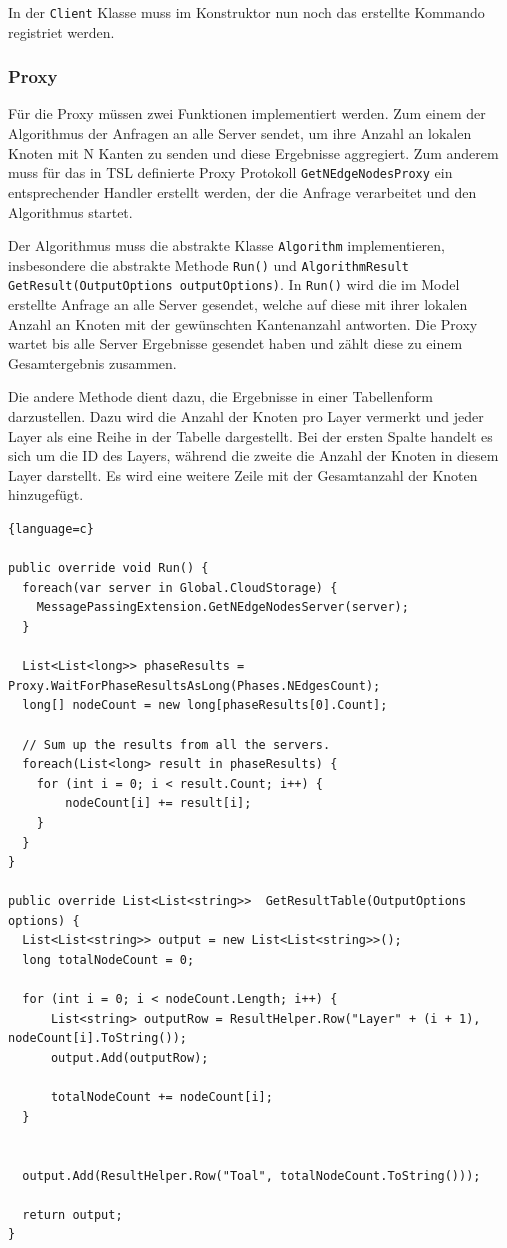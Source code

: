In der \verb|Client| Klasse muss im Konstruktor nun noch das erstellte Kommando registriet werden.

\subsubsection{Proxy}

Für die Proxy müssen zwei Funktionen implementiert werden. Zum einem der Algorithmus der Anfragen an alle Server sendet, um ihre Anzahl an lokalen Knoten mit N Kanten zu senden und diese Ergebnisse aggregiert. Zum anderem muss 
für das in TSL definierte Proxy Protokoll \verb|GetNEdgeNodesProxy| ein entsprechender Handler erstellt werden, der die Anfrage verarbeitet und den Algorithmus startet.

Der Algorithmus muss die abstrakte Klasse \verb|Algorithm| implementieren, insbesondere die abstrakte Methode \verb|Run()| und \verb|AlgorithmResult GetResult(OutputOptions outputOptions)|. In \verb|Run()| wird die im Model erstellte Anfrage an alle Server gesendet, welche auf diese mit ihrer lokalen Anzahl an Knoten mit der gewünschten Kantenanzahl antworten. Die Proxy
wartet bis alle Server Ergebnisse gesendet haben und zählt diese zu einem Gesamtergebnis zusammen.

Die andere Methode dient dazu, die Ergebnisse in einer Tabellenform darzustellen. Dazu wird die Anzahl der Knoten pro Layer vermerkt und jeder Layer als eine Reihe in der Tabelle dargestellt. Bei der ersten Spalte handelt es sich um die ID des Layers, während die zweite die Anzahl der Knoten in diesem Layer darstellt. Es wird eine weitere Zeile mit der Gesamtanzahl der Knoten hinzugefügt.

\begin{lstlisting}{language=c}

public override void Run() {
  foreach(var server in Global.CloudStorage) {
    MessagePassingExtension.GetNEdgeNodesServer(server);
  }

  List<List<long>> phaseResults =  Proxy.WaitForPhaseResultsAsLong(Phases.NEdgesCount);
  long[] nodeCount = new long[phaseResults[0].Count];

  // Sum up the results from all the servers.
  foreach(List<long> result in phaseResults) {
    for (int i = 0; i < result.Count; i++) {
        nodeCount[i] += result[i];
    }
  }
}

public override List<List<string>>  GetResultTable(OutputOptions options) {
  List<List<string>> output = new List<List<string>>();
  long totalNodeCount = 0;

  for (int i = 0; i < nodeCount.Length; i++) {
      List<string> outputRow = ResultHelper.Row("Layer" + (i + 1), nodeCount[i].ToString()); 
      output.Add(outputRow);

      totalNodeCount += nodeCount[i];
  }


  output.Add(ResultHelper.Row("Toal", totalNodeCount.ToString()));

  return output;
}



\end{lstlisting}


